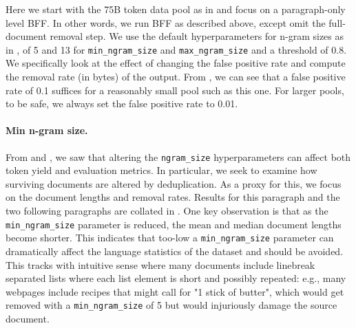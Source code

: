 \documentclass{article}
\begin{document}
Here we start with the 75B token data pool as in  and focus on a paragraph-only level BFF. In other words, we run BFF as described above, except omit the full-document removal step. We use the default hyperparameters for n-gram sizes as in \citet{bff}, of 5 and 13 for \texttt{min\_ngram\_size} and \texttt{max\_ngram\_size} and a threshold of 0.8. We specifically look at the effect of changing the false positive rate and compute the removal rate (in bytes) of the output. From , we can see that a false positive rate of 0.1 suffices for a reasonably small pool such as this one. For larger pools, to be safe, we always set the false positive rate to 0.01.

\paragraph{Min n-gram size.}
From  and , we saw that altering the \texttt{ngram\_size} hyperparameters can affect both token yield and evaluation metrics. In particular, we seek to examine how surviving documents are altered by deduplication. As a proxy for this, we focus on the document lengths and removal rates. Results for this paragraph and the two following paragraphs are collated in . One key observation is that as the \texttt{min\_ngram\_size} parameter is reduced, the mean and median document lengths become shorter. This indicates that too-low a \texttt{min\_ngram\_size} parameter can dramatically affect the language statistics of the dataset and should be avoided. This tracks with intuitive sense where many documents include linebreak separated lists where each list element is short and possibly repeated: e.g., many webpages include recipes that might call for "1 stick of butter", which would get removed with a \texttt{min\_ngram\_size} of 5 but would injuriously damage the source document.
\end{document}
